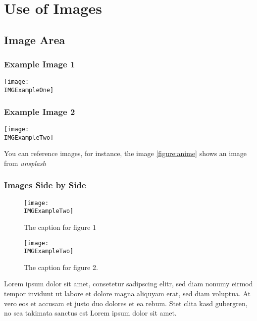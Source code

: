 \chapter{Use of Images}

\section{Image Area}
\subsection{Example Image 1}

\texttt{[image: \\IMGExampleOne]}

\subsection{Example Image 2}

\texttt{[image: \\IMGExampleTwo]}
\label{figure:anime}

You can reference images, for instance, the image \ref{figure:anime} shows
an image from \textit{unsplash}

\subsection{Images Side by Side}

\begin{figure}[htbp]
  \centering
  \begin{minipage}[b]{0.45\linewidth}
    \centering
    \texttt{[image: \\IMGExampleTwo]}
    \caption{The caption for figure 1}
    \label{fig:chapter001_dist_001}
  \end{minipage}
  \hspace{0.5cm}
  \begin{minipage}[b]{0.45\linewidth}
    \centering
    \texttt{[image: \\IMGExampleTwo]}
    \caption{The caption for figure 2.}
    \label{fig:chapter001_reward_001}
  \end{minipage}
\end{figure}

Lorem ipsum dolor sit amet, consetetur sadipscing elitr, sed diam nonumy eirmod tempor invidunt ut labore et dolore magna aliquyam erat, sed diam voluptua. At vero eos et accusam et justo duo dolores et ea rebum. Stet clita kasd gubergren, no sea takimata sanctus est Lorem ipsum dolor sit amet.
